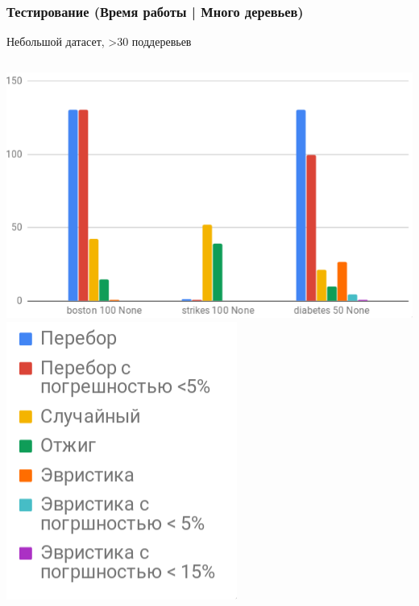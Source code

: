 \documentclass{beamer}
\begin{document}
\begin{frame}
    \frametitle{Тестирование (Время работы | Много деревьев)}
    Небольшой датасет, >30 поддеревьев
    \vfill
    \begin{columns}
        \includegraphics[width=\textwidth]{time_trees.png}
        \includegraphics[width=\textwidth]{time_legend.png}
    \end{columns}
\end{frame}
\end{document}
